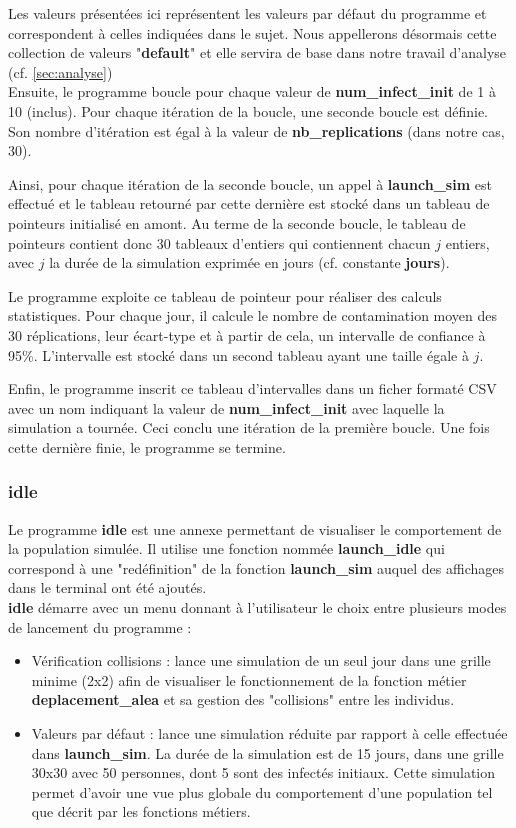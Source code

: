 \documentclass[12pt,french,titlepage]{article}
\begin{document}
Les valeurs présentées ici représentent les valeurs par défaut du programme et correspondent à celles indiquées dans le sujet. Nous appellerons désormais cette collection de valeurs "\textbf{default}" et elle servira de base dans notre travail d'analyse (cf. \ref{sec:analyse})\\

Ensuite, le programme boucle pour chaque valeur de \textbf{num\_infect\_init} de 1 à 10 (inclus). Pour chaque itération de la boucle, une seconde boucle est définie. Son nombre d'itération est égal à la valeur de \textbf{nb\_replications} (dans notre cas, 30). 

Ainsi, pour chaque itération de la seconde boucle, un appel à \textbf{launch\_sim} est effectué et le tableau retourné par cette dernière est stocké dans un tableau de pointeurs initialisé en amont. Au terme de la seconde boucle, le tableau de pointeurs contient donc 30 tableaux d'entiers qui contiennent chacun $j$ entiers, avec $j$ la durée de la simulation exprimée en jours (cf. constante \textbf{jours}).


Le programme exploite ce tableau de pointeur pour réaliser des calculs statistiques. Pour chaque jour, il calcule le nombre de contamination moyen des 30 réplications, leur écart-type et à partir de cela, un intervalle de confiance à 95\%. L'intervalle est stocké dans un second tableau ayant une taille égale à $j$.

Enfin, le programme inscrit ce tableau d'intervalles dans un ficher formaté CSV avec un nom indiquant la valeur de \textbf{num\_infect\_init} avec laquelle la simulation a tournée. Ceci conclu une itération de la première boucle. Une fois cette dernière finie, le programme se termine.

\subsubsection{idle}
Le programme \textbf{idle} est une annexe permettant de visualiser le comportement de la population simulée. Il utilise une fonction nommée \textbf{launch\_idle} qui correspond à une "redéfinition" de la fonction \textbf{launch\_sim} auquel des affichages dans le terminal ont été ajoutés.\\

\textbf{idle} démarre avec un menu donnant à l'utilisateur le choix entre plusieurs modes de lancement du programme :
\begin{itemize}
\item Vérification collisions : lance une simulation de un seul jour dans une grille minime (2x2) afin de visualiser le fonctionnement de la fonction métier \textbf{deplacement\_alea} et sa gestion des "collisions" entre les individus.

\item Valeurs par défaut : lance une simulation réduite par rapport à celle effectuée dans \textbf{launch\_sim}. La durée de la simulation est de 15 jours, dans une grille 30x30 avec 50 personnes, dont 5 sont des infectés initiaux. Cette simulation permet d'avoir une vue plus globale du comportement d'une population tel que décrit par les fonctions métiers.\\
\end{itemize}
\end{document}
